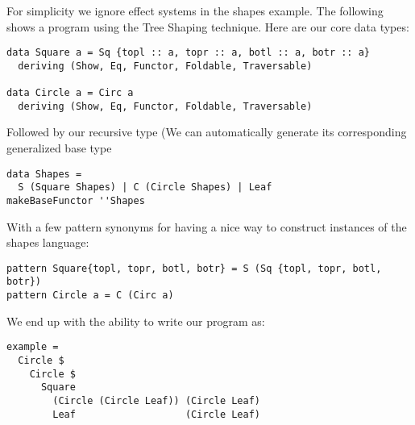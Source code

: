 For simplicity we ignore effect systems in the shapes example. The following shows a program using the Tree Shaping technique. Here are our core data types:
\begin{verbatim}
data Square a = Sq {topl :: a, topr :: a, botl :: a, botr :: a}
  deriving (Show, Eq, Functor, Foldable, Traversable)

data Circle a = Circ a
  deriving (Show, Eq, Functor, Foldable, Traversable)
\end{verbatim}
Followed by our recursive type (We can automatically generate its corresponding generalized base type
\begin{verbatim}
data Shapes =
  S (Square Shapes) | C (Circle Shapes) | Leaf
makeBaseFunctor ''Shapes
\end{verbatim}

With a few pattern synonyms for having a nice way to construct instances of the shapes language:
\begin{verbatim}
pattern Square{topl, topr, botl, botr} = S (Sq {topl, topr, botl, botr})
pattern Circle a = C (Circ a)
\end{verbatim}

We end up with the ability to write our program as:
\begin{verbatim}
example =
  Circle $
    Circle $
      Square
        (Circle (Circle Leaf)) (Circle Leaf)
        Leaf                   (Circle Leaf)
\end{verbatim}

